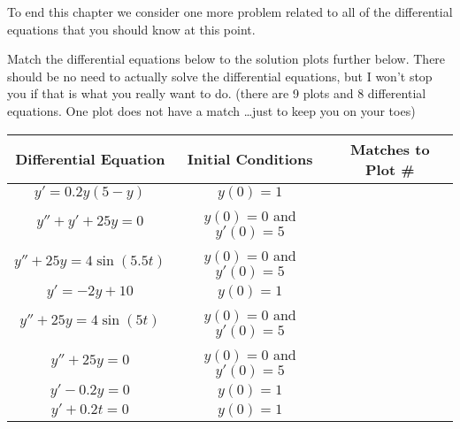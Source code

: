 To end this chapter we consider one more problem related to all of the differential
equations that you should know at this point.  
\begin{problem}
    Match the differential equations below to the solution plots further below.  There
    should be no need to actually solve the differential equations, but I won't stop you
    if that is what you really want to do. (there are 9 plots and 8 differential
    equations.  One plot does not have a match \dots just to keep you on your toes)
\begin{center}
    \begin{tabular}{|c|c|c|}
        \hline
        Differential Equation & Initial Conditions & Matches to Plot \# \\ \hline \hline
        $y'=0.2y(5-y)$ & $y(0)=1$ &  \\ \hline
        $y'' + y' + 25y = 0$ & $y(0)=0$ and $y'(0)=5$ &  \\ \hline
        $y''+25y=4\sin(5.5t)$ & $y(0)=0$ and $y'(0)=5$ &  \\ \hline
        $y'=-2y+10$ & $y(0)=1$ &  \\ \hline
        $y''+25y=4\sin(5t)$ & $y(0)=0$ and $y'(0)=5$ &  \\ \hline
        $y''+25y=0$ & $y(0)=0$ and $y'(0)=5$ &  \\ \hline
        $y'-0.2y=0$ & $y(0)=1$ &  \\ \hline
        $y'+0.2t=0$ & $y(0)=1$ &  \\ \hline
    \end{tabular}
\end{center}
\def\scl{0.6}
\begin{center}
\end{center}


\end{problem}
